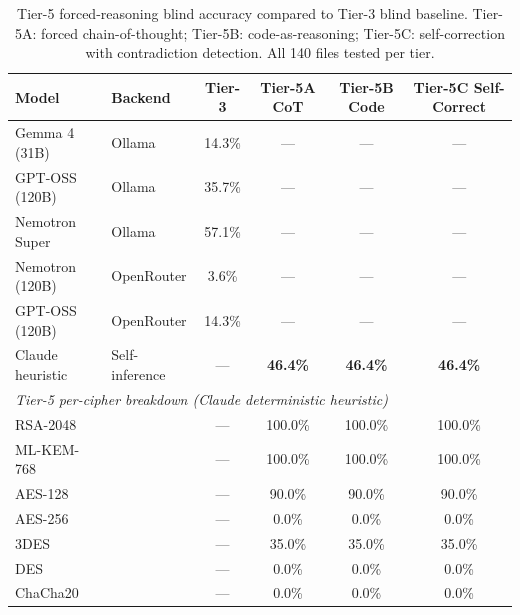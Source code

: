 \begin{table}[htbp]
\centering
\caption{Tier-5 forced-reasoning blind accuracy compared to Tier-3 blind baseline. Tier-5A: forced chain-of-thought; Tier-5B: code-as-reasoning; Tier-5C: self-correction with contradiction detection. All 140 files tested per tier.}
\label{tab:tier5}
\begin{tabular}{llcccc}
\toprule
\textbf{Model} & \textbf{Backend} & \textbf{Tier-3} & \textbf{Tier-5A CoT} & \textbf{Tier-5B Code} & \textbf{Tier-5C Self-Correct} \\
\midrule
Gemma 4 (31B) & Ollama & 14.3\% & — & — & — \\
GPT-OSS (120B) & Ollama & 35.7\% & — & — & — \\
Nemotron Super & Ollama & 57.1\% & — & — & — \\
Nemotron (120B) & OpenRouter & 3.6\% & — & — & — \\
GPT-OSS (120B) & OpenRouter & 14.3\% & — & — & — \\
\midrule
Claude heuristic & Self-inference & — & \textbf{46.4\%} & \textbf{46.4\%} & \textbf{46.4\%} \\
\midrule
\multicolumn{6}{l}{\textit{Tier-5 per-cipher breakdown (Claude deterministic heuristic)}} \\
\midrule
RSA-2048 & & — & 100.0\% & 100.0\% & 100.0\% \\
ML-KEM-768 & & — & 100.0\% & 100.0\% & 100.0\% \\
AES-128 & & — & 90.0\% & 90.0\% & 90.0\% \\
AES-256 & & — & 0.0\% & 0.0\% & 0.0\% \\
3DES & & — & 35.0\% & 35.0\% & 35.0\% \\
DES & & — & 0.0\% & 0.0\% & 0.0\% \\
ChaCha20 & & — & 0.0\% & 0.0\% & 0.0\% \\
\bottomrule
\end{tabular}
\end{table}

